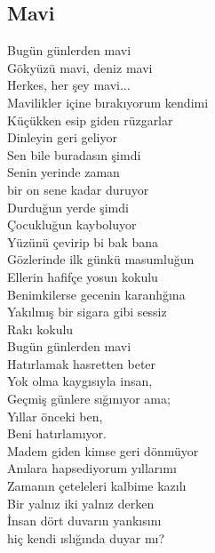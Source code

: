\subsection{Mavi}

Bugün günlerden mavi \\
Gökyüzü mavi, deniz mavi \\
Herkes, her şey mavi... \\
Mavilikler içine bırakıyorum kendimi \\
Küçükken esip giden rüzgarlar \\
Dinleyin geri geliyor \\

\noindent\newline
Sen bile buradasın şimdi \\
Senin yerinde zaman \\
bir on sene kadar duruyor \\
Durduğun yerde şimdi \\
Çocukluğun kayboluyor \\
Yüzünü çevirip bi bak bana \\
Gözlerinde ilk günkü masumluğun \\
Ellerin hafifçe yosun kokulu \\

\noindent\newline
Benimkilerse gecenin karanlığına \\
Yakılmış bir sigara gibi sessiz \\
Rakı kokulu \\

\noindent\newline
Bugün günlerden mavi \\
Hatırlamak hasretten beter \\
Yok olma kaygısıyla insan, \\
Geçmiş günlere sığınıyor ama; \\
Yıllar önceki ben, \\
Beni hatırlamıyor. \\

\noindent\newline
Madem giden kimse geri dönmüyor \\
Anılara hapsediyorum yıllarımı \\
Zamanın çeteleleri kalbime kazılı \\
Bir yalnız iki yalnız derken \\
İnsan dört duvarın yankısını \\
hiç kendi ıslığında duyar mı?

